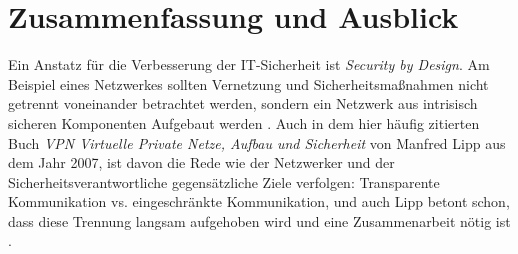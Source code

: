 \chapter{Zusammenfassung und Ausblick}

Ein Anstatz für die Verbesserung der IT-Sicherheit ist \emph{Security by Design}. Am Beispiel eines Netzwerkes sollten Vernetzung und Sicherheitsmaßnahmen nicht getrennt voneinander betrachtet werden, sondern ein Netzwerk aus intrisisch sicheren Komponenten Aufgebaut werden \cite{nicholson2018blurring}. Auch in dem hier häufig zitierten Buch \emph{VPN Virtuelle Private Netze, Aufbau und Sicherheit} von Manfred Lipp aus dem Jahr 2007, ist davon die Rede wie der Netzwerker und der Sicherheitsverantwortliche gegensätzliche Ziele verfolgen: Transparente Kommunikation vs. eingeschränkte Kommunikation, und auch Lipp betont schon, dass diese Trennung langsam aufgehoben wird und eine Zusammenarbeit nötig ist \cite{lipp2007vpn}. 